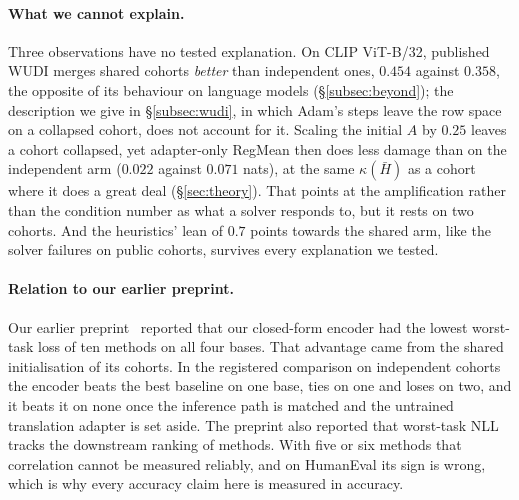 \paragraph{What we cannot explain.} Three observations have no tested
explanation. On CLIP ViT-B/32, published WUDI merges shared cohorts
\emph{better} than independent ones, $0.454$ against $0.358$, the opposite of
its behaviour on language models (\S\ref{subsec:beyond}); the description we
give in \S\ref{subsec:wudi}, in which Adam's steps leave the row space on a
collapsed cohort, does not account for it. Scaling the initial $A$ by $0.25$
leaves a cohort collapsed, yet adapter-only RegMean then does less damage than
on the independent arm ($0.022$ against $0.071$ nats), at the same
$\kappa(\bar H)$ as a cohort where it does a great deal (\S\ref{sec:theory}).
That points at the amplification rather than the condition number as what a
solver responds to, but it rests on two cohorts. And the heuristics' lean of
$0.7$ points towards the shared arm, like the solver failures on public
cohorts, survives every explanation we tested.

\paragraph{Relation to our earlier preprint.} Our earlier
preprint~\citep{pathak2026rd} reported that our closed-form encoder had the
lowest worst-task loss of ten methods on all four bases. That advantage came
from the shared initialisation of its cohorts. In the registered comparison on
independent cohorts the encoder beats the best baseline on one base, ties on
one and loses on two, and it beats it on none once the inference path is
matched and the untrained translation adapter is set aside. The preprint also
reported that worst-task NLL tracks the downstream ranking of methods. With
five or six methods that correlation cannot be measured reliably, and on
HumanEval its sign is wrong, which is why every accuracy claim here is
measured in accuracy.

